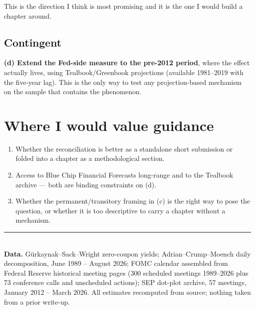 \documentclass[11pt]{article}
\begin{document}
This is the direction I think is most promising and it is the one I would build a chapter around.

\subsection*{Contingent}
\textbf{(d) Extend the Fed-side measure to the pre-2012 period}, where the effect actually lives, using Tealbook/Greenbook projections (available 1981--2019 with the five-year lag). This is the only way to test any projection-based mechanism on the sample that contains the phenomenon.

\section{Where I would value guidance}

\begin{enumerate}\setlength\itemsep{0.15em}
\item Whether the reconciliation is better as a standalone short submission or folded into a chapter as a methodological section.
\item Access to Blue Chip Financial Forecasts long-range and to the Tealbook archive --- both are binding constraints on (d).
\item Whether the permanent/transitory framing in (c) is the right way to pose the question, or whether it is too descriptive to carry a chapter without a mechanism.
\end{enumerate}

\vspace{0.8em}
\noindent\rule{\textwidth}{0.4pt}\\[0.3em]
\footnotesize\textbf{Data.} G\"urkaynak--Sack--Wright zero-coupon yields; Adrian--Crump--Moench daily decomposition, June 1989 -- August 2026; FOMC calendar assembled from Federal Reserve historical meeting pages (300 scheduled meetings 1989--2026 plus 73 conference calls and unscheduled actions); SEP dot-plot archive, 57 meetings, January 2012 -- March 2026. All estimates recomputed from source; nothing taken from a prior write-up.
\end{document}
